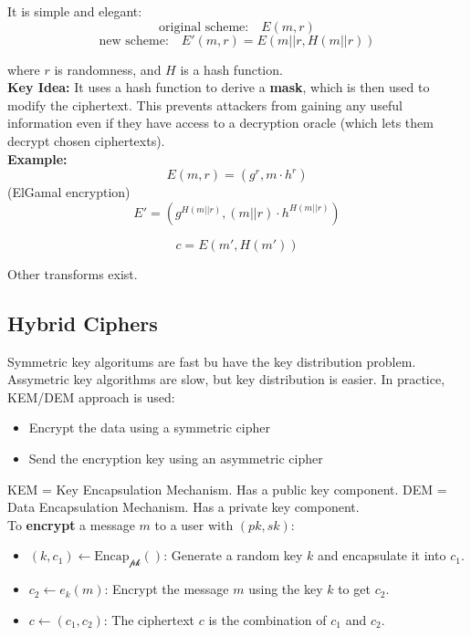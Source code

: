 It is simple and elegant: 
\[ \text{original scheme:} \quad E(m,r) \]
\[ \text{new scheme:} \quad E'(m,r) = E(m ||r, H(m||r)) \]

where $r$ is randomness, and $H$ is a hash function. \\

\textbf{Key Idea:}
It uses a hash function to derive a \textbf{mask}, which is then used to modify the ciphertext. 
This prevents attackers from gaining any useful information even if they have access to a decryption oracle 
(which lets them decrypt chosen ciphertexts). \\

\textbf{Example:}
\[ E(m,r) = (g^r, m \cdot h^r) \]
(ElGamal encryption) \\

\[ E' = (g^{H(m||r)}, (m ||r)\cdot h^{H(m||r)}) \]

\[ c = E(m', H(m'))\]

Other transforms exist.

\subsection{Hybrid Ciphers}
Symmetric key algoritums are fast bu have the key distribution problem. Assymetric key algorithms
are slow, but key distribution is easier. In practice, KEM/DEM approach is used:

\begin{itemize}
    \item Encrypt the data using a symmetric cipher
    \item Send the encryption key using an asymmetric cipher
\end{itemize}

KEM = Key Encapsulation Mechanism. Has a public key component.
DEM = Data Encapsulation Mechanism. Has a private key component. \\

To \textbf{encrypt} a message \( m \) to a user with \( (pk, sk) \):

\begin{itemize}
    \item \( (k, c_1) \leftarrow \text{Encap}_{\mathcal{pk}}() \): Generate a random key \( k \) and encapsulate it into \( c_1 \).
    \item \( c_2 \leftarrow e_k(m) \): Encrypt the message \( m \) using the key \( k \) to get \( c_2 \).
    \item \( c \leftarrow (c_1, c_2) \): The ciphertext \( c \) is the combination of \( c_1 \) and \( c_2 \).
\end{itemize}


